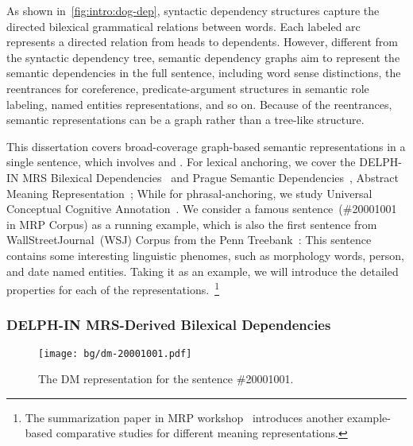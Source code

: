 As shown in~\autoref{fig:intro:dog-dep}, syntactic dependency
structures capture the directed bilexical grammatical relations
between words. Each labeled arc represents a directed relation from
heads to dependents. However, different from the syntactic dependency
tree, semantic dependency graphs aim to represent the semantic
dependencies in the full sentence, including word sense distinctions,
the reentrances for coreference, predicate-argument structures in
semantic role labeling, named entities representations, and so
on. Because of the reentrances, semantic representations can be a
graph rather than a tree-like structure.

This dissertation covers broad-coverage graph-based semantic
representations in a single sentence, which involves
 and . For lexical
anchoring, we cover the DELPH-IN MRS Bilexical
Dependencies~\cite[DM,][]{Iva:Oep:Ovr:12} and Prague Semantic
Dependencies~\cite[PSD,][]{hajic2012announcing,miyao2014house},
Abstract Meaning Representation~\cite[AMR,][]{Ban:Bon:Cai:13}; While
for phrasal-anchoring, we study Universal Conceptual Cognitive
Annotation~\cite[UCCA,][]{Abe:Rap:13b}. We consider a famous
sentence~(\#20001001 in MRP Corpus) as a running example, which is
also the first sentence from WallStreetJournal~(WSJ) Corpus from the
Penn Treebank~\citep{Mar:San:Mar:93}: \emph{} This sentence contains some interesting linguistic
phenomes, such as morphology words, person, and date named
entities. Taking it as an example, we will introduce the detailed
properties for each of the representations.~\footnote{The
  summarization paper in MRP workshop~\citep{Mar:San:Mar:93}
  introduces another example-based comparative studies for different
  meaning representations.}


\subsubsection{DELPH-IN MRS-Derived Bilexical Dependencies}
\label{sssec:bg:dm}

\begin{figure}[!tbp]
\centering
\texttt{[image: bg/dm-20001001.pdf]}
\caption{\label{fig:bg:dm}The DM representation for the sentence
  \#20001001.}
\end{figure}

